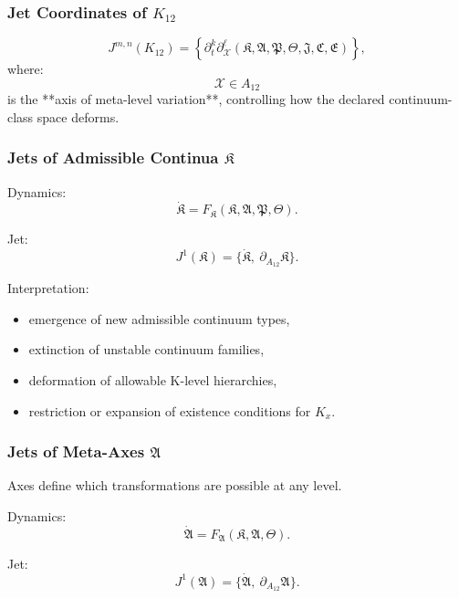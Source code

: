 \subsubsection{Jet Coordinates of $K_{12}$}

\[
J^{m,n}(K_{12}) =
\left\{
\partial_t^k \partial_{\mathcal{X}}^\ell 
(\mathfrak{K},\mathfrak{A},\mathfrak{P},\mathfrak{\Theta},\mathfrak{J},\mathfrak{C},\mathfrak{E})
\right\},
\]
where:
\[
\mathcal{X} \in A_{12}
\]
is the **axis of meta-level variation**, controlling how the declared continuum-class space deforms.


\subsubsection{Jets of Admissible Continua $\mathfrak{K}$}

Dynamics:
\[
\dot{\mathfrak{K}}
=
F_{\mathfrak{K}}(\mathfrak{K},\mathfrak{A},\mathfrak{P},\mathfrak{\Theta}).
\]

Jet:
\[
J^1(\mathfrak{K})
= \{\dot{\mathfrak{K}},\ \partial_{A_{12}}\mathfrak{K}\}.
\]

Interpretation:
\begin{itemize}
    \item emergence of new admissible continuum types,
    \item extinction of unstable continuum families,
    \item deformation of allowable K-level hierarchies,
    \item restriction or expansion of existence conditions for $K_x$.
\end{itemize}


\subsubsection{Jets of Meta-Axes $\mathfrak{A}$}

Axes define which transformations are possible at any level.

Dynamics:
\[
\dot{\mathfrak{A}}
=
F_{\mathfrak{A}}(\mathfrak{K},\mathfrak{A},\mathfrak{\Theta}).
\]

Jet:
\[
J^1(\mathfrak{A})
= \{\dot{\mathfrak{A}},\ \partial_{A_{12}}\mathfrak{A}\}.
\]

